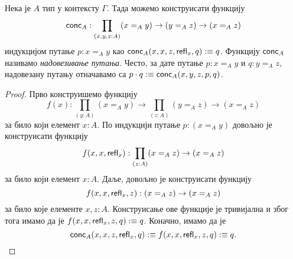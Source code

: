 \documentclass[12pt,oneside]{memoir}
\begin{document}
\begin{lemma}
    Нека је $A$ тип у контексту $\Gamma$. Тада можемо конструисати функцију \[\mathsf{conc}_{A} : \prod_{(x, y, z : A)} (x =_A y) \to (y =_A z) \to (x =_A z)\] индукцијом путање $p : x =_A y$ као $\mathsf{conc}_{A} (x, x, z, \mathsf{refl}_{x}, q) :\equiv q$. Функцију $\mathsf{conc}_{A}$ називамо \emph{надовезивање путања}. Често, за дате путање $p : x =_A y$ и $q : y =_A z$, надовезану путању отначавамо са $p \cdot q :\equiv \mathsf{conc}_{A} (x, y, z, p, q)$.
\end{lemma}
\begin{proof}
    Прво конструишемо функцију
    \[f(x) : \prod_{(y : A)} (x =_A y) \to \prod_{(z : A)} (y =_A z) \to (x =_A z)\] за било који елемент $x : A$. По индукцији путање $p : (x =_A y)$ довољно је конструисати функцију \[ f(x, x, \mathsf{refl}_{x}) : \prod_{(z : A)} (x =_A z) \to (x =_A z) \] за било који елемент $x : A$. Даље, довољно је конструисати функцију \[ f(x, x, \mathsf{refl}_{x}, z) : (x =_A z) \to (x =_A z) \] за било које елементе $x, z : A$. Конструисање ове функције је тривијална и због тога имамо да је $f(x, x, \mathsf{refl}_{x}, z, q) :\equiv q$. Коначно, имамо да је \[\mathsf{conc}_{A}(x, x, z, \mathsf{refl}_{x}, q) :\equiv f(x, x, \mathsf{refl}_{x}, z, q) :\equiv q. \]
\end{proof}
\end{document}
